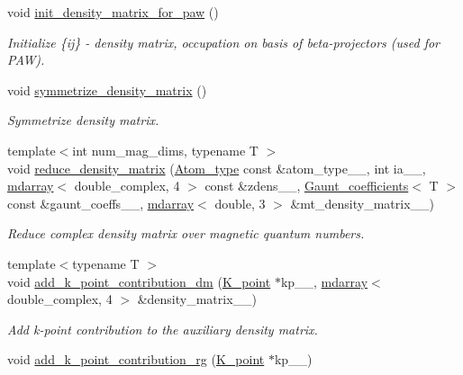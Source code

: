 \begin{DoxyCompactItemize}
\item 
void \hyperlink{classsirius_1_1_density_af399d9d8dce9410e3a3fd2881f53a7fe}{init\+\_\+density\+\_\+matrix\+\_\+for\+\_\+paw} ()
\begin{DoxyCompactList}\small\item\em Initialize \{ij\} -\/ density matrix, occupation on basis of beta-\/projectors (used for P\+A\+W). \end{DoxyCompactList}\item 
void \hyperlink{classsirius_1_1_density_a5aa2c64b50733841e1508208a242ee87}{symmetrize\+\_\+density\+\_\+matrix} ()
\begin{DoxyCompactList}\small\item\em Symmetrize density matrix. \end{DoxyCompactList}\item 
{\footnotesize template$<$int num\+\_\+mag\+\_\+dims, typename T $>$ }\\void \hyperlink{classsirius_1_1_density_afb79baac042b44ac8513cad372eb8dc5}{reduce\+\_\+density\+\_\+matrix} (\hyperlink{classsirius_1_1_atom__type}{Atom\+\_\+type} const \&atom\+\_\+type\+\_\+\+\_\+, int ia\+\_\+\+\_\+, \hyperlink{classsddk_1_1mdarray}{mdarray}$<$ double\+\_\+complex, 4 $>$ const \&zdens\+\_\+\+\_\+, \hyperlink{classsirius_1_1_gaunt__coefficients}{Gaunt\+\_\+coefficients}$<$ T $>$ const \&gaunt\+\_\+coeffs\+\_\+\+\_\+, \hyperlink{classsddk_1_1mdarray}{mdarray}$<$ double, 3 $>$ \&mt\+\_\+density\+\_\+matrix\+\_\+\+\_\+)
\begin{DoxyCompactList}\small\item\em Reduce complex density matrix over magnetic quantum numbers. \end{DoxyCompactList}\item 
{\footnotesize template$<$typename T $>$ }\\void \hyperlink{classsirius_1_1_density_a196bae7e30dffa1e83db9976ef8e0109}{add\+\_\+k\+\_\+point\+\_\+contribution\+\_\+dm} (\hyperlink{classsirius_1_1_k__point}{K\+\_\+point} $\ast$kp\+\_\+\+\_\+, \hyperlink{classsddk_1_1mdarray}{mdarray}$<$ double\+\_\+complex, 4 $>$ \&density\+\_\+matrix\+\_\+\+\_\+)
\begin{DoxyCompactList}\small\item\em Add k-\/point contribution to the auxiliary density matrix. \end{DoxyCompactList}\item 
void \hyperlink{classsirius_1_1_density_a7494a6071dc9a5ace4d812abb3eedfdd}{add\+\_\+k\+\_\+point\+\_\+contribution\+\_\+rg} (\hyperlink{classsirius_1_1_k__point}{K\+\_\+point} $\ast$kp\+\_\+\+\_\+)

\end{DoxyCompactItemize}
